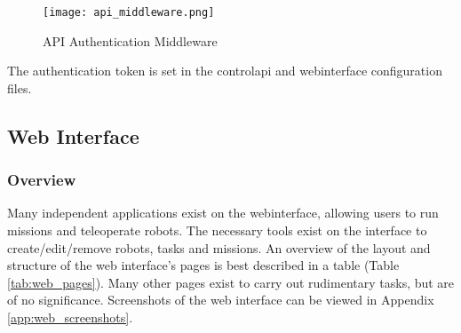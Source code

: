 \begin{figure}[!htb]
\begin{center}
\texttt{[image: api\_middleware.png]}
\end{center}
\caption{API Authentication Middleware}
\label{fig:api-auth-middleware}
\end{figure}
\noindent
The authentication token is set in the \gls{controlapi} and \gls{webinterface} configuration files.

\subsection{Web Interface}

\subsubsection{Overview}
Many independent applications exist on the \gls{webinterface}, allowing users to run missions and teleoperate robots. The necessary tools exist on the interface to create/edit/remove robots, tasks and missions.
\newline
An overview of the layout and structure of the web interface's pages is best described in a table (Table \ref{tab:web_pages}). Many other pages exist to carry out rudimentary tasks, but are of no significance. Screenshots of the web interface can be viewed in Appendix \ref{app:web_screenshots}.

